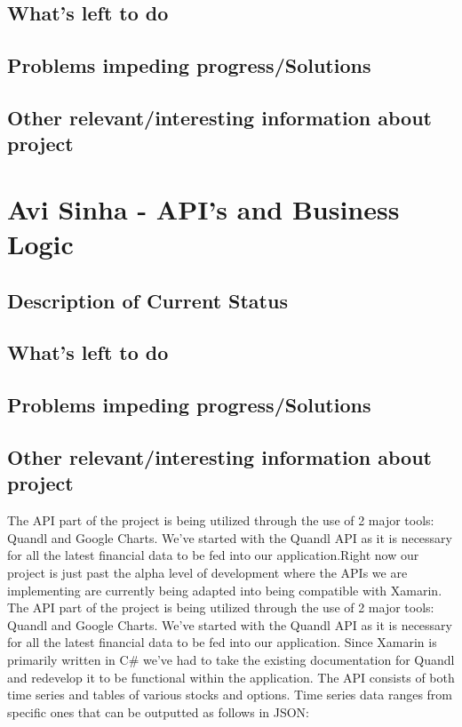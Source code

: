 \documentclass[letterpaper,10pt,titlepage,journal,compsoc,draftclsnofoot,onecolumn]{IEEEtran}
\begin{document}
\subsection{What's left to do}
\subsection{Problems impeding progress/Solutions}
\subsection{Other relevant/interesting information about project}
    
\section{Avi Sinha - API's and Business Logic}

\subsection{Description of Current Status}
\subsection{What's left to do}
\subsection{Problems impeding progress/Solutions}
\subsection{Other relevant/interesting information about project}
The API part of the project is being utilized through the use of 2 major tools: Quandl and Google Charts. We've started with the Quandl API as it is necessary for all the latest financial data to be fed into our application.Right now our project is just past the alpha level of development where the APIs we are implementing are currently being adapted into being compatible with Xamarin. 
The API part of the project is being utilized through the use of 2 major tools: Quandl and Google Charts. We've started with the Quandl API as it is necessary for all the latest financial data to be fed into our application. Since Xamarin is primarily written in C\# we've had to take the existing documentation for Quandl and redevelop it to be functional within the application. The API consists of both time series and tables of various stocks and options. Time series data ranges from specific ones that can be outputted as follows in JSON: 
\end{document}

